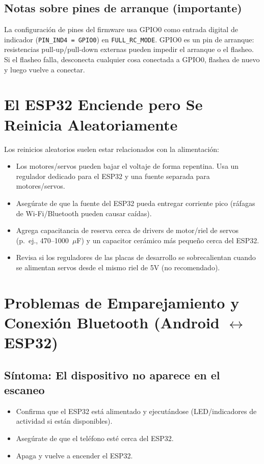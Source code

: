 \subsection*{Notas sobre pines de arranque (importante)}
La configuración de pines del firmware usa GPIO0 como entrada digital de indicador (\texttt{PIN\_IND4 = GPIO0}) en
\texttt{FULL\_RC\_MODE}. GPIO0 es un pin de arranque: resistencias pull-up/pull-down externas pueden impedir el arranque o el flasheo.
Si el flasheo falla, desconecta cualquier cosa conectada a GPIO0, flashea de nuevo y luego vuelve a conectar.

\section{El ESP32 Enciende pero Se Reinicia Aleatoriamente}
\label{sec:esp32-resets}

Los reinicios aleatorios suelen estar relacionados con la alimentación:

\begin{itemize}
    \item Los motores/servos pueden bajar el voltaje de forma repentina. Usa un regulador dedicado para el ESP32 y una fuente separada para motores/servos.
    \item Asegúrate de que la fuente del ESP32 pueda entregar corriente pico (ráfagas de Wi-Fi/Bluetooth pueden causar caídas).
    \item Agrega capacitancia de reserva cerca de drivers de motor/riel de servos (p.\ ej., 470--1000~\(\mu\)F) y un capacitor cerámico más pequeño cerca del ESP32.
    \item Revisa si los reguladores de las placas de desarrollo se sobrecalientan cuando se alimentan servos desde el mismo riel de 5V (no recomendado).
\end{itemize}

\section{Problemas de Emparejamiento y Conexión Bluetooth (Android \texorpdfstring{$\leftrightarrow$}{<->} ESP32)}
\label{sec:bluetooth-problems}

\subsection*{Síntoma: El dispositivo no aparece en el escaneo}
\begin{itemize}
    \item Confirma que el ESP32 está alimentado y ejecutándose (LED/indicadores de actividad si están disponibles).
    \item Asegúrate de que el teléfono esté cerca del ESP32.
    \item Apaga y vuelve a encender el ESP32.
\end{itemize}

